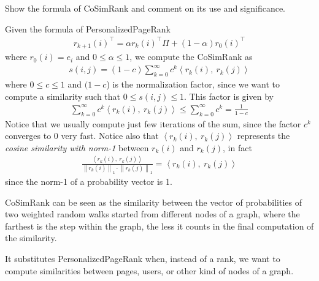 \exercise

Show the formula of CoSimRank and comment on its use and significance.

\solution

Given the formula of PersonalizedPageRank
%
\begin{align*}
  r_{k+1}(i)^\top = \alpha r_k(i)^\top \Pi + (1 - \alpha)r_0(i)^\top
\end{align*}
%
where $r_0(i) = e_i$ and $0 \le \alpha \le 1$, we compute the CoSimRank as
%
\begin{align*}
  s(i, j) = (1 - c) \sum\limits_{k = 0}^\infty c^k \left\langle r_k(i),\
  r_k(j) \right\rangle
\end{align*}
%
where $0 \le c \le 1$ and $(1 - c$) is the normalization factor, since
we want to compute a similarity such that $0 \le s(i, j) \le 1$. This factor is
given by
%
\begin{align*}
  \sum\limits_{k = 0}^\infty c^k \left\langle r_k(i),\ r_k(j) \right\rangle \le
  \sum\limits_{k = 0}^\infty c^k = \frac{1}{1 - c}
\end{align*}
%
Notice that we usually compute just few iterations of the sum, since the factor
$c^k$ converges to 0 very fast. Notice also that $\left\langle r_k(i),\ r_k(j)
\right\rangle$ represents the \emph{cosine similarity with norm-1} between
$r_k(i)$ and $r_k(j)$, in fact
%
\begin{align*}
  \frac{\left\langle r_k(i),\ r_k(j) \right\rangle}{\left\lVert r_k(i)
  \right\rVert_1 \cdot \left\lVert r_k(j) \right\rVert_1} = \left\langle
  r_k(i),\ r_k(j) \right\rangle
\end{align*}
%
since the norm-1 of a probability vector is 1.

CoSimRank can be seen as the similarity between the vector of probabilities of
two weighted random walks started from different nodes of a graph, where the
farthest is the step within the graph, the less it counts in the final
computation of the similarity.

It substitutes PersonalizedPageRank when, instead of a rank, we want to compute
similarities between pages, users, or other kind of nodes of a graph.
